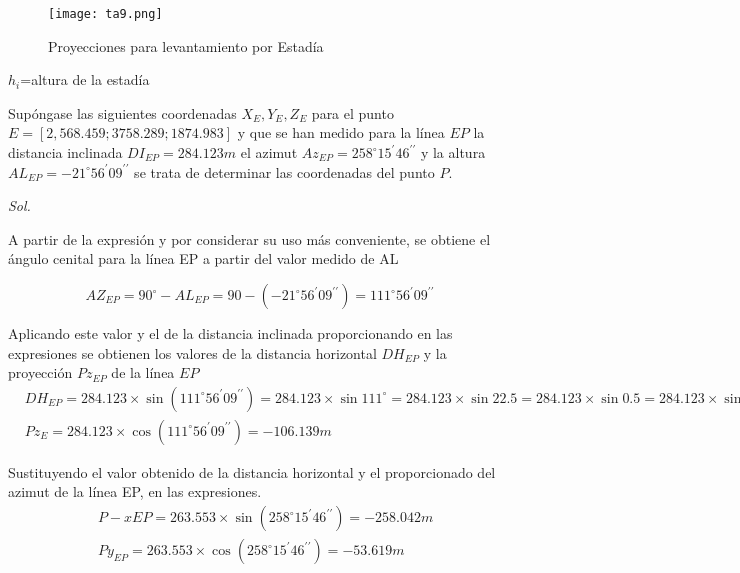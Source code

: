 \begin{figure}[h!]
  \centerline{\texttt{[image: ta9.png]}}
  \caption{Proyecciones para levantamiento por Estadía}
  \label{ta9}
\end{figure}

\begin{notation}
    $h_i$=altura de la estadía
\end{notation}

\begin{example}
    Supóngase las siguientes coordenadas $X_E,Y_E,Z_E$ para el punto $E=\left[2,568.459;3758.289; 1874.983\right]$ y que se han medido para la línea $EP$ la distancia inclinada $DI_{EP}=284.123m$ el azimut $Az_{EP}=258^{\circ}15^{\prime}46^{\prime\prime}$ y la altura
    $AL_{EP}=-21^{\circ}56^{\prime}09^{\prime\prime}$ se trata de determinar las coordenadas del punto $P$. 
\end{example}

\textit{ Sol. }

A partir de la expresión y por considerar su uso más conveniente, se obtiene el ángulo cenital para la línea EP a partir del valor medido de AL

\begin{equation*}
    AZ_{EP}=90^{\circ}-AL_{EP}=90-\left(-21^{\circ}56^{\prime}09^{\prime\prime}\right)=111^{\circ}56^{\prime}09^{\prime\prime}
\end{equation*}

Aplicando este valor y el de la distancia inclinada proporcionando en las expresiones se obtienen los valores de la distancia horizontal $DH_{EP}$ y la proyección $Pz_{EP}$ de la línea $EP$
\begin{align*}
    &DH_{EP}=284.123\times \sin{(111^{\circ}56^{\prime}09^{\prime\prime})}=284.123\times \sin{111^{\circ}}=284.123\times \sin{22.5}=284.123\times \sin{0.5}=284.123\times \sin{0.087}=+263.533m\\
    &Pz_{E}=284.123\times \cos{(111^{\circ}56^{\prime}09^{\prime\prime})}=-106.139m
\end{align*}

Sustituyendo el valor obtenido de la distancia horizontal y el proporcionado del azimut de la línea EP, en las expresiones.
\begin{align*}
    &P-{xEP}=263.553\times \sin{\left(258^{\circ}15^{\prime}46^{\prime\prime}\right)}=-258.042m\\
    &Py_{EP}=263.553\times \cos{\left(258^{\circ}15^{\prime}46^{\prime\prime}\right)}=-53.619m\\
\end{align*}

